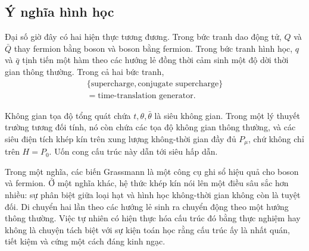 
\subsection{Ý nghĩa hình học}

Đại số giờ đây có hai hiện thực tương đương. Trong bức tranh dao động tử, \(Q\) và \(\bar Q\) thay fermion bằng boson và boson bằng fermion. Trong bức tranh hình học, \(q\) và \(\bar q\) tịnh tiến một hàm theo các hướng lẻ đồng thời cảm sinh một độ dời thời gian thông thường. Trong cả hai bức tranh,
\begin{equation}
\begin{gathered}
\{\text{supercharge},\text{conjugate supercharge}\}\\
=\text{time-translation generator}.
\end{gathered}
\end{equation}

Không gian tọa độ tổng quát chứa \(t,\theta,\bar\theta\) là siêu không gian. Trong một lý thuyết trường tương đối tính, nó còn chứa các tọa độ không gian thông thường, và các siêu điện tích khép kín trên xung lượng không-thời gian đầy đủ \(P_\mu\), chứ không chỉ trên \(H=P_0\). Uốn cong cấu trúc này dẫn tới siêu hấp dẫn.

Trong một nghĩa, các biến Grassmann là một công cụ ghi sổ hiệu quả cho boson và fermion. Ở một nghĩa khác, hệ thức khép kín nói lên một điều sâu sắc hơn nhiều: sự phân biệt giữa loại hạt và hình học không-thời gian không còn là tuyệt đối. Di chuyển hai lần theo các hướng lẻ sinh ra chuyển động theo một hướng thông thường. Việc tự nhiên có hiện thực hóa cấu trúc đó bằng thực nghiệm hay không là chuyện tách biệt với sự kiện toán học rằng cấu trúc ấy là nhất quán, tiết kiệm và cứng một cách đáng kinh ngạc.
